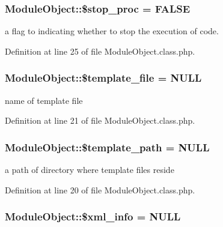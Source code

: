 \subsubsection[{\$stop\+\_\+proc}]{\setlength{\rightskip}{0pt plus 5cm}Module\+Object\+::\$stop\+\_\+proc = F\+A\+L\+S\+E}\label{classModuleObject_ad4efa1b4c623247763e4d56f76c5fb1c}


a flag to indicating whether to stop the execution of code. 



Definition at line 25 of file Module\+Object.\+class.\+php.

\hypertarget{classModuleObject_a6eddf08e627527affc7e835a6d302733}{}
\subsubsection[{\$template\+\_\+file}]{\setlength{\rightskip}{0pt plus 5cm}Module\+Object\+::\$template\+\_\+file = N\+U\+L\+L}\label{classModuleObject_a6eddf08e627527affc7e835a6d302733}


name of template file 



Definition at line 21 of file Module\+Object.\+class.\+php.

\hypertarget{classModuleObject_a8a632bae853adef8e2ab9596a3a86661}{}
\subsubsection[{\$template\+\_\+path}]{\setlength{\rightskip}{0pt plus 5cm}Module\+Object\+::\$template\+\_\+path = N\+U\+L\+L}\label{classModuleObject_a8a632bae853adef8e2ab9596a3a86661}


a path of directory where template files reside 



Definition at line 20 of file Module\+Object.\+class.\+php.

\hypertarget{classModuleObject_aa0003698bcfe16bb25031435df251715}{}
\subsubsection[{\$xml\+\_\+info}]{\setlength{\rightskip}{0pt plus 5cm}Module\+Object\+::\$xml\+\_\+info = N\+U\+L\+L}\label{classModuleObject_aa0003698bcfe16bb25031435df251715}


